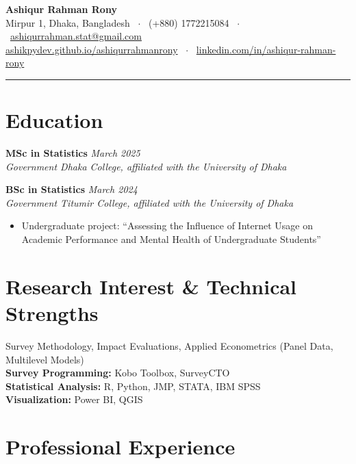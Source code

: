 \documentclass[11pt]{article}
\newcommand{\cvdate}[1]{\hfill{\small\itshape #1}}
\begin{document}
\begin{center}
  {\huge \bfseries \color{accent} Ashiqur Rahman Rony}\\[4pt]
  {\small Mirpur 1, Dhaka, Bangladesh \ $\cdot$ \ (+880) 1772215084 \ $\cdot$ \ \href{mailto:ashiqurrahman.stat@gmail.com}{ashiqurrahman.stat@gmail.com}}\\[2pt]
  {\small
  \href{https://ashikpydev.github.io/ashiqurrahmanrony}{ashikpydev.github.io/ashiqurrahmanrony} \ $\cdot$ \
  \href{https://www.linkedin.com/in/ashiqur-rahman-rony}{linkedin.com/in/ashiqur-rahman-rony}}\\[3pt]
  {\color{accent}\rule{0.4\textwidth}{0.6pt}}
\end{center}

\section*{Education}
\textbf{MSc in Statistics} \cvdate{March 2025}\\
\textit{Government Dhaka College, affiliated with the University of Dhaka}

\vspace{4pt}
\textbf{BSc in Statistics} \cvdate{March 2024}\\
\textit{Government Titumir College, affiliated with the University of Dhaka}
\begin{itemize}
  \item Undergraduate project: ``Assessing the Influence of Internet Usage on Academic Performance and Mental Health of Undergraduate Students''
\end{itemize}

\section*{Research Interest \& Technical Strengths}
Survey Methodology, Impact Evaluations, Applied Econometrics (Panel Data, Multilevel Models)
\vspace{3pt}\\
\textbf{Survey Programming:} Kobo Toolbox, SurveyCTO\\
\textbf{Statistical Analysis:} R, Python, JMP, STATA, IBM SPSS\\
\textbf{Visualization:} Power BI, QGIS

\section*{Professional Experience}
\end{document}
